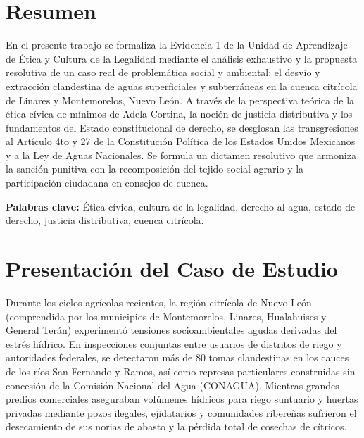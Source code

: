 \documentclass[spanish,letterpaper,oneside]{article}
\begin{document}
\hypersetup{pageanchor=false}
\begingroup
\fontsize{14}{17}\selectfont
\renewcommand{\Huge}{\fontsize{14}{17}\selectfont\bfseries}
\renewcommand{\large}{\fontsize{14}{17}\selectfont}
\templatePortrait
\clearpage
\endgroup
\hypersetup{pageanchor=true}
\templatePagecfg
\singlespacing
\setlength{\tabcolsep}{8pt}
\renewcommand{\arraystretch}{1.18}

\section*{Resumen}
En el presente trabajo se formaliza la Evidencia 1 de la Unidad de Aprendizaje de Ética y Cultura de la Legalidad mediante el análisis exhaustivo y la propuesta resolutiva de un caso real de problemática social y ambiental: el desvío y extracción clandestina de aguas superficiales y subterráneas en la cuenca citrícola de Linares y Montemorelos, Nuevo León. A través de la perspectiva teórica de la ética cívica de mínimos de Adela Cortina, la noción de justicia distributiva y los fundamentos del Estado constitucional de derecho, se desglosan las transgresiones al Artículo 4to y 27 de la Constitución Política de los Estados Unidos Mexicanos y a la Ley de Aguas Nacionales. Se formula un dictamen resolutivo que armoniza la sanción punitiva con la recomposición del tejido social agrario y la participación ciudadana en consejos de cuenca.

\vspace{0.4cm}
\noindent\textbf{Palabras clave:} Ética cívica, cultura de la legalidad, derecho al agua, estado de derecho, justicia distributiva, cuenca citrícola.

\section{Presentación del Caso de Estudio}
Durante los ciclos agrícolas recientes, la región citrícola de Nuevo León (comprendida por los municipios de Montemorelos, Linares, Hualahuises y General Terán) experimentó tensiones socioambientales agudas derivadas del estrés hídrico. En inspecciones conjuntas entre usuarios de distritos de riego y autoridades federales, se detectaron más de 80 tomas clandestinas en los cauces de los ríos San Fernando y Ramos, así como represas particulares construidas sin concesión de la Comisión Nacional del Agua (CONAGUA).
Mientras grandes predios comerciales aseguraban volúmenes hídricos para riego suntuario y huertas privadas mediante pozos ilegales, ejidatarios y comunidades ribereñas sufrieron el desecamiento de sus norias de abasto y la pérdida total de cosechas de cítricos.
\end{document}
